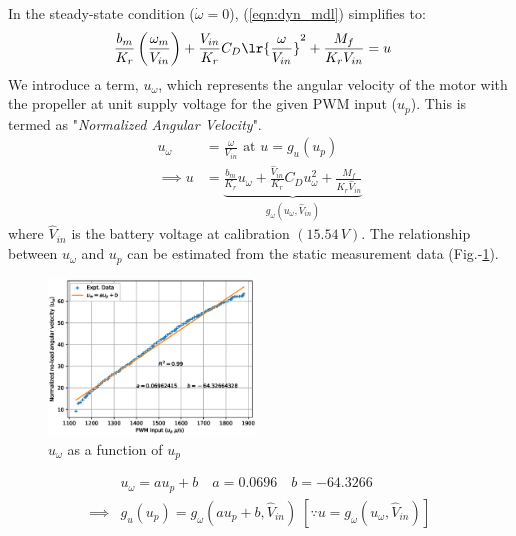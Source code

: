 In the steady-state condition ($\dot \omega = 0$), (\ref{eqn:dyn_mdl}) simplifies to:
\begin{align}
    &\frac{b_m}{K_r} \left(\frac{\omega_m}{V_{in}}\right) + \frac{V_{in}}{K_r} C_D \lr{\frac{\omega}{V_{in}}}^2 + \frac{M_f}{K_r V_{in}} = u
\end{align}
We introduce a term, $u_{\omega}$, which represents the angular velocity of the motor with the propeller at unit supply voltage for the given PWM input ($u_p$). This is termed as "\textit{Normalized Angular Velocity}".
\begin{align}
    u_{\omega} &= \frac{\omega}{V_{in}} \text{  at  } u = g_u(u_p) \\
    \implies u &= \underbrace{\frac{b_m}{K_r} u_\omega + \frac{\hat V_{in}}{K_r} C_D u_\omega^2 + \frac{M_f}{K_r  \hat V_{in}}}_{g_\omega (u_\omega, \hat V_{in})}
     \label{eqn::input_def}
\end{align}
where $\hat V_{in}$ is the battery voltage at calibration $(15.54\,V)$.
The relationship between $u_\omega$ and $u_p$ can be estimated from the static
measurement data (Fig.-\ref{fig::norm_omega}).
\begin{figure}[H]
    \centering
    \includegraphics[width = 0.49\textwidth]{Part2/figs/3_figs/norm_omega/no-load_rpm.eps}
    \caption{$u_\omega$ as a function of $u_p$}
    \label{fig::norm_omega}
\end{figure}
\begin{align}
    &u_\omega = a u_p + b
    \quad a = 0.0696
    \quad b = -64.3266\\
    \implies& g_u(u_p) = g_\omega(a u_p  + b, \hat V_{in})
    \; [\because u = g_\omega(u_\omega, \hat V_{in})]
\end{align}
